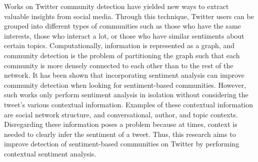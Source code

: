 Works on Twitter community detection have yielded new ways to extract valuable insights from social media. Through this technique, Twitter users can be grouped into different types of communities such as those who have the same interests, those who interact a lot, or those who have similar sentiments about certain topics. Computationally, information is represented as a graph, and community detection is the problem of partitioning the graph such that each community is more densely connected to each other than to the rest of the network. It has been shown that incorporating sentiment analysis can improve community detection when looking for sentiment-based communities. However, such works only perform sentiment analysis in isolation without considering the tweet's various contextual information. Examples of these contextual information are social network structure, and conversational, author, and topic contexts. Disregarding these information poses a problem because at times, context is needed to clearly infer the sentiment of a tweet. Thus, this research aims to improve detection of sentiment-based communities on Twitter by performing contextual sentiment analysis.
